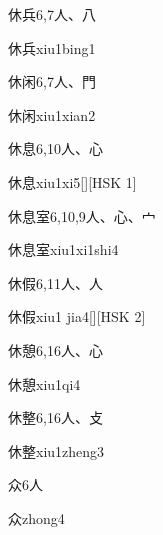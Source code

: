 \begin{entry}{休兵}{6,7}{⼈、⼋}
  \begin{phonetics}{休兵}{xiu1bing1}
  \end{phonetics}
\end{entry}

\begin{entry}{休闲}{6,7}{⼈、⾨}
  \begin{phonetics}{休闲}{xiu1xian2}
  \end{phonetics}
\end{entry}

\begin{entry}{休息}{6,10}{⼈、⼼}
  \begin{phonetics}{休息}{xiu1xi5}[][HSK 1]
  \end{phonetics}
\end{entry}

\begin{entry}{休息室}{6,10,9}{⼈、⼼、⼧}
  \begin{phonetics}{休息室}{xiu1xi1shi4}
  \end{phonetics}
\end{entry}

\begin{entry}{休假}{6,11}{⼈、⼈}
  \begin{phonetics}{休假}{xiu1 jia4}[][HSK 2]
  \end{phonetics}
\end{entry}

\begin{entry}{休憩}{6,16}{⼈、⼼}
  \begin{phonetics}{休憩}{xiu1qi4}
  \end{phonetics}
\end{entry}

\begin{entry}{休整}{6,16}{⼈、⽁}
  \begin{phonetics}{休整}{xiu1zheng3}
  \end{phonetics}
\end{entry}

\begin{entry}{众}{6}{⼈}
  \begin{phonetics}{众}{zhong4}
  \end{phonetics}
\end{entry}

